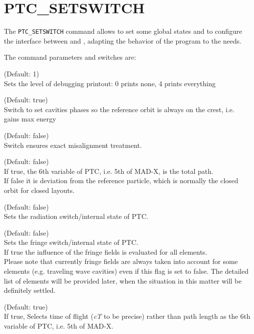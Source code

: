 \section{PTC\_SETSWITCH}
\label{sec:ptc-setswitch}

The \texttt{PTC\_SETSWITCH} command allows to set some global \ptc states and to configure the interface between {\madx} and {\ptc}, adapting the behavior of the program to the needs.   


The command parameters and switches are:
\begin{madlist}
	 (Default: 1)\\
	Sets the level of debugging printout: 0 prints none, 4 prints everything   
	
	 (Default: true)\\
	Switch to set cavities phases so the reference orbit is always on
	the crest, i.e. gains max energy    
	
	 (Default: false)\\
	Switch ensures exact misalignment treatment.   
	
	 (Default: false)\\
	If true, the 6th variable of PTC, i.e. 5th of MAD-X, is the total
	path.  \\
	If false it is deviation from the reference particle,
	which is normally the closed orbit for closed layouts.    
	
	 (Default: false)\\    
	Sets the radiation switch/internal state of PTC.   
	
	 (Default: false)\\    
	Sets the fringe switch/internal state of PTC. \\ 
	If true the influence of the fringe fields is evaluated for all
	elements. \\       
	Please note that currently fringe fields are always taken into
	account for some elements (e.g. traveling wave cavities) even if
	this flag is set to false. The detailed list of elements
	will be provided later, when the situation in this matter will be
	definitely settled.    
	
	 (Default: true)\\  
	If true, Selects time of flight (\textit{cT} to be precise) rather
	than path length as the 6th variable of PTC, i.e. 5th of MAD-X.     
	
\end{madlist}

